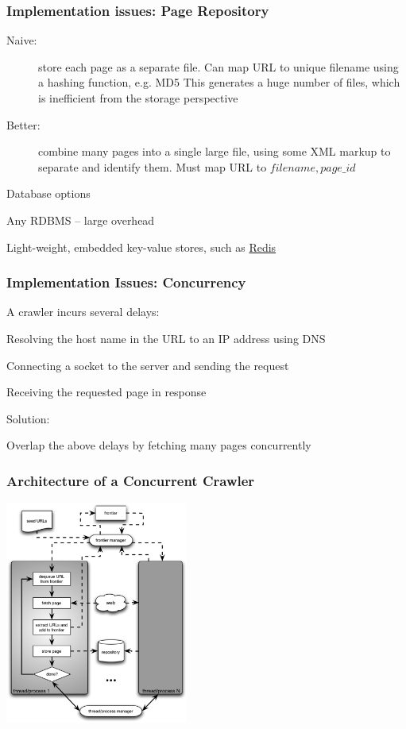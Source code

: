 \documentclass{beamer}
\begin{document}
\begin{frame} \frametitle{Implementation issues: Page Repository}

\begin{description}
\item [Naive:] store each page as a separate file.
Can map URL to unique filename using a hashing function, e.g. MD5
This generates a huge number of files, which is inefficient from the storage perspective

\item [Better:] combine many pages into a single large file, using some XML markup to separate and identify them.
Must map URL to ${filename, page\_id}$
\end{description}

\begin{block}{Database options}

Any RDBMS -- large overhead

Light-weight, embedded key-value stores, such as \href{https://redis.io/}{Redis}

\end{block}

\end{frame}

\begin{frame} \frametitle{Implementation Issues: Concurrency}

\begin{block}{A crawler incurs several delays:}

Resolving the host name in the URL to an IP address using DNS

Connecting a socket to the server and sending the request

Receiving the requested page in response
\end{block}

\begin{block}{Solution:} 

Overlap the above delays by fetching many pages concurrently
\end{block}


\end{frame}

\begin{frame} \frametitle{Architecture of a Concurrent Crawler}

    \centering
    \includegraphics[width=6cm]{concurrent-crawler-arch}

\end{frame}
\end{document}
